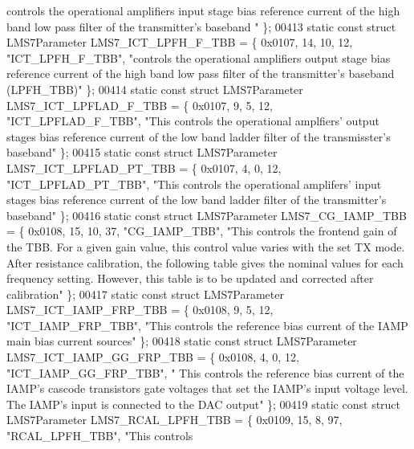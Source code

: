 \begin{DoxyCode}
{       controls the operational amplifiers input stage bias reference current of the high band low pass filter of the
       transmitter's baseband "} \};
00413 \textcolor{keyword}{static} \textcolor{keyword}{const} \textcolor{keyword}{struct }LMS7Parameter LMS7_ICT_LPFH_F_TBB = \{ 0x0107, 14, 10, 12, \textcolor{stringliteral}{"ICT\_LPFH\_F\_TBB"}, \textcolor{stringliteral}{"controls
       the operational amplifiers output stage bias reference current of the high band low pass filter of the
       transmitter's baseband (LPFH\_TBB)"} \};
00414 \textcolor{keyword}{static} \textcolor{keyword}{const} \textcolor{keyword}{struct }LMS7Parameter LMS7_ICT_LPFLAD_F_TBB = \{ 0x0107, 9, 5, 12, \textcolor{stringliteral}{"ICT\_LPFLAD\_F\_TBB"}, \textcolor{stringliteral}{"This
       controls the operational amplfiers' output stages bias reference current of the low band ladder filter of the
       transmisster's baseband"} \};
00415 \textcolor{keyword}{static} \textcolor{keyword}{const} \textcolor{keyword}{struct }LMS7Parameter LMS7_ICT_LPFLAD_PT_TBB = \{ 0x0107, 4, 0, 12, \textcolor{stringliteral}{"ICT\_LPFLAD\_PT\_TBB"}, \textcolor{stringliteral}{"This
       controls the operational amplifers' input stages bias reference current of the low band ladder filter of the
       transmitter's baseband"} \};
00416 \textcolor{keyword}{static} \textcolor{keyword}{const} \textcolor{keyword}{struct }LMS7Parameter LMS7_CG_IAMP_TBB = \{ 0x0108, 15, 10, 37, \textcolor{stringliteral}{"CG\_IAMP\_TBB"}, \textcolor{stringliteral}{"This controls
       the frontend gain of the TBB. For a given gain value, this control value varies with the set TX mode. After
       resistance calibration, the following table gives the nominal values for each frequency setting. However, this
       table is to be updated and corrected after calibration"} \};
00417 \textcolor{keyword}{static} \textcolor{keyword}{const} \textcolor{keyword}{struct }LMS7Parameter LMS7_ICT_IAMP_FRP_TBB = \{ 0x0108, 9, 5, 12, \textcolor{stringliteral}{"ICT\_IAMP\_FRP\_TBB"}, \textcolor{stringliteral}{"This
       controls the reference bias current of the IAMP main bias current sources"} \};
00418 \textcolor{keyword}{static} \textcolor{keyword}{const} \textcolor{keyword}{struct }LMS7Parameter LMS7_ICT_IAMP_GG_FRP_TBB = \{ 0x0108, 4, 0, 12, \textcolor{stringliteral}{"ICT\_IAMP\_GG\_FRP\_TBB"}, \textcolor{stringliteral}{"
      This controls the reference bias current of the IAMP's cascode transistors gate voltages that set the IAMP's
       input voltage level. The IAMP's input is connected to the DAC output"} \};
00419 \textcolor{keyword}{static} \textcolor{keyword}{const} \textcolor{keyword}{struct }LMS7Parameter LMS7_RCAL_LPFH_TBB = \{ 0x0109, 15, 8, 97, \textcolor{stringliteral}{"RCAL\_LPFH\_TBB"}, \textcolor{stringliteral}{"This controls
}
\end{DoxyCode}

